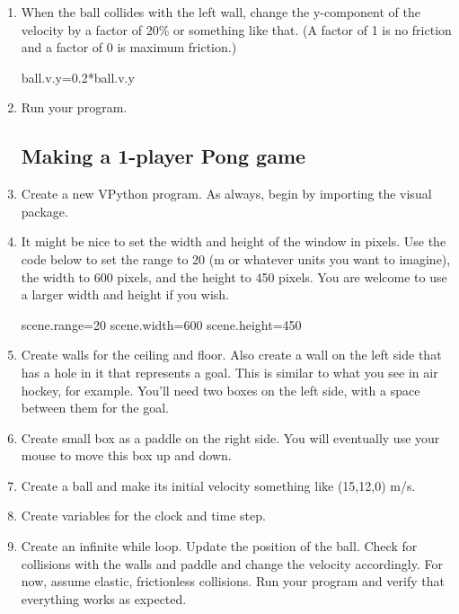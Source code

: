 \begin{enumerate}
\item When the ball collides with the left wall, change the y-component of the velocity by a factor of 20\% or something like that. (A factor of 1 is no friction and a factor of 0 is maximum friction.)

\begin{myvpython}
        ball.v.y=0.2*ball.v.y
\end{myvpython}

\item Run your program.


\subsection*{Making a 1-player Pong game}

\item Create a new VPython program. As always, begin by importing the visual package.

\item It might be nice to set the width and height of the window in pixels. Use the code below to set the range to 20 (m or whatever units you want to imagine), the width to 600 pixels, and the height to 450 pixels. You are welcome to use a larger width and height if you wish.

\begin{myvpython}
scene.range=20
scene.width=600
scene.height=450
\end{myvpython}

\item Create walls for the ceiling and floor. Also create a wall on the left side that has a hole in it that represents a goal. This is similar to what you see in air hockey, for example. You'll need two boxes on the left side, with a space between them for the goal.

\item Create small box as a paddle on the right side. You will eventually use your mouse to move this box up and down.

\item Create a ball and make its initial velocity something like (15,12,0) m/s.

\item Create variables for the clock and time step.

\item Create an infinite while loop. Update the position of the ball. Check for collisions with the walls and paddle and change the velocity accordingly. For now, assume elastic, frictionless collisions. Run your program and verify that everything works as expected.


\end{enumerate}
